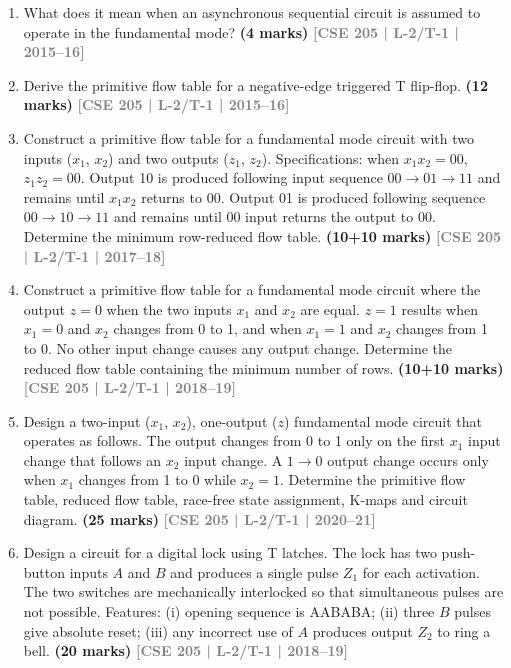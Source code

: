 \documentclass[12pt,a4paper]{article}
\newcommand{\yr}[1]{\hfill\textcolor{gray}{\small\textbf{[#1]}}}
\newcommand{\mk}[1]{\textcolor{orange!70!black}{\small\textbf{(#1 marks)}}}
\begin{document}
\begin{enumerate}
\item What does it mean when an asynchronous sequential circuit is assumed to operate in the fundamental mode?
\mk{4} \yr{CSE 205 | L-2/T-1 | 2015--16}

\item Derive the primitive flow table for a negative-edge triggered T flip-flop.
\mk{12} \yr{CSE 205 | L-2/T-1 | 2015--16}


\item Construct a primitive flow table for a fundamental mode circuit with two inputs ($x_1$, $x_2$) and two outputs ($z_1$, $z_2$). Specifications: when $x_1x_2=00$, $z_1z_2=00$. Output 10 is produced following input sequence $00\to01\to11$ and remains until $x_1x_2$ returns to 00. Output 01 is produced following sequence $00\to10\to11$ and remains until 00 input returns the output to 00. Determine the minimum row-reduced flow table.
\mk{10+10} \yr{CSE 205 | L-2/T-1 | 2017--18}

\item Construct a primitive flow table for a fundamental mode circuit where the output $z=0$ when the two inputs $x_1$ and $x_2$ are equal. $z=1$ results when $x_1=0$ and $x_2$ changes from 0 to 1, and when $x_1=1$ and $x_2$ changes from 1 to 0. No other input change causes any output change. Determine the reduced flow table containing the minimum number of rows.
\mk{10+10} \yr{CSE 205 | L-2/T-1 | 2018--19}

\item Design a two-input ($x_1$, $x_2$), one-output ($z$) fundamental mode circuit that operates as follows. The output changes from 0 to 1 only on the first $x_1$ input change that follows an $x_2$ input change. A $1\to0$ output change occurs only when $x_1$ changes from 1 to 0 while $x_2=1$. Determine the primitive flow table, reduced flow table, race-free state assignment, K-maps and circuit diagram.
\mk{25} \yr{CSE 205 | L-2/T-1 | 2020--21}


\item Design a circuit for a digital lock using T latches. The lock has two push-button inputs $A$ and $B$ and produces a single pulse $Z_1$ for each activation. The two switches are mechanically interlocked so that simultaneous pulses are not possible. Features: (i) opening sequence is AABABA; (ii) three $B$ pulses give absolute reset; (iii) any incorrect use of $A$ produces output $Z_2$ to ring a bell.
\mk{20} \yr{CSE 205 | L-2/T-1 | 2018--19}


\end{enumerate}
\end{document}
